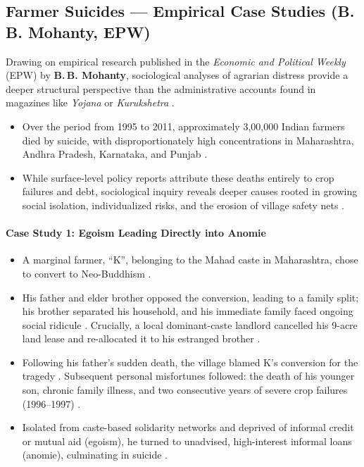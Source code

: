 \subsection{Farmer Suicides --- Empirical Case Studies (B.\,B. Mohanty, EPW)}

Drawing on empirical research published in the \textit{Economic and Political Weekly} (EPW) by \textbf{B.\,B. Mohanty}, sociological analyses of agrarian distress provide a deeper structural perspective than the administrative accounts found in magazines like \textit{Yojana} or \textit{Kurukshetra} .

\begin{DataFact}
\begin{itemize}
    \item Over the period from 1995 to 2011, approximately 3,00,000 Indian farmers died by suicide, with disproportionately high concentrations in Maharashtra, Andhra Pradesh, Karnataka, and Punjab .
    \item While surface-level policy reports attribute these deaths entirely to crop failures and debt, sociological inquiry reveals deeper causes rooted in growing social isolation, individualized risks, and the erosion of village safety nets .
\end{itemize}
\end{DataFact}

\paragraph{Case Study 1: Egoism Leading Directly into Anomie}
\begin{itemize}
    \item A marginal farmer, ``K'', belonging to the Mahad caste in Maharashtra, chose to convert to Neo-Buddhism .
    \item His father and elder brother opposed the conversion, leading to a family split; his brother separated his household, and his immediate family faced ongoing social ridicule . Crucially, a local dominant-caste landlord cancelled his 9-acre land lease and re-allocated it to his estranged brother .
    \item Following his father's sudden death, the village blamed K's conversion for the tragedy . Subsequent personal misfortunes followed: the death of his younger son, chronic family illness, and two consecutive years of severe crop failures (1996--1997) .
    \item Isolated from caste-based solidarity networks and deprived of informal credit or mutual aid (egoism), he turned to unadvised, high-interest informal loans (anomie), culminating in suicide .
\end{itemize}

